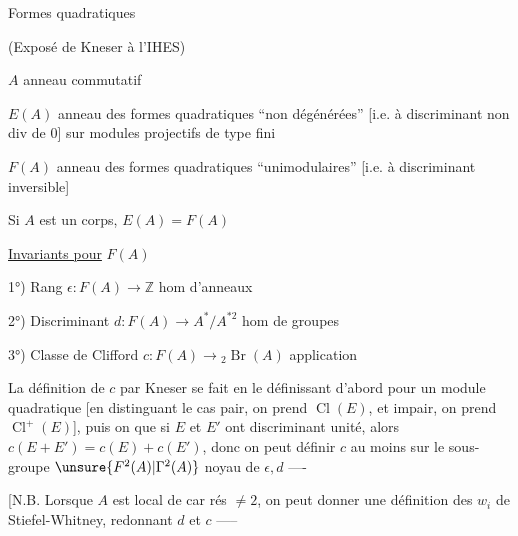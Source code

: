 Formes quadratiques

(Exposé de Kneser à l’IHES)

$A$ anneau commutatif

$E(A)$ anneau des formes quadratiques ``non dégénérées'' [i.e. à discriminant non div de $0$] sur modules projectifs de type fini

$F(A)$ anneau des formes quadratiques ``unimodulaires'' [i.e. à discriminant inversible]

Si $A$ est un corps, $E(A)=F(A)$

\uline{Invariants pour} $F(A)$

1°) Rang \quad $\epsilon:F(A)\longrightarrow\mathbb Z$ \quad hom d’anneaux

2°) Discriminant \quad $d:F(A)\longrightarrow A^*/A^{*2}$ \quad hom de groupes

3°) Classe de Clifford \quad $c:F(A)\longrightarrow{}_2\operatorname{Br}(A)$ \quad application

La définition de $c$ par Kneser se fait en le définissant d’abord pour un module quadratique [en distinguant le cas pair, on prend $\operatorname{Cl}(E)$, et impair, on prend $\operatorname{Cl}^{+}(E)$], puis on  que si $E$ et $E'$ ont  discriminant unité, alors $c(E+E')=c(E)+c(E')$, donc on peut définir $c$ au moins sur le sous-groupe $\unsure{F^2(A)|\Gamma^2(A)}$ noyau de $\epsilon,d$ ----

[N.B. Lorsque $A$ est local de car rés $\neq2$, on peut donner une définition des $w_i$ de Stiefel-Whitney, redonnant $d$ et $c$ -----
